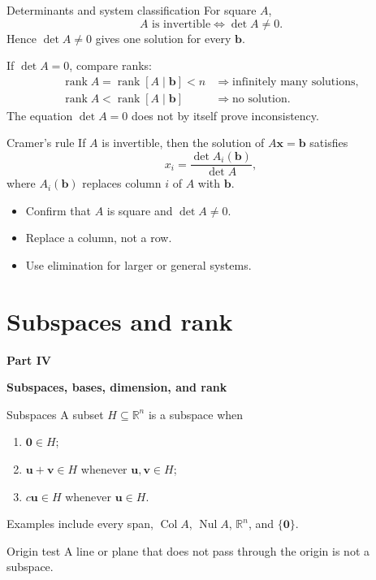 \documentclass[aspectratio=169]{beamer}
\newcommand{\R}{\mathbb{R}}
\newcommand{\vect}[1]{\mathbf{#1}}
\newcommand{\Col}{\operatorname{Col}}
\newcommand{\Nul}{\operatorname{Nul}}
\newcommand{\rank}{\operatorname{rank}}
\newcommand{\sectioncard}[2]{%
  \begin{frame}[plain]
    \vfill\centering
    {\Huge\color{lectureorange}\bfseries #1}\par\bigskip
    {\LARGE\color{lecturegreen}\bfseries #2}
    \vfill
  \end{frame}}
\begin{document}
\begin{frame}{Determinants and system classification}
For square $A$,
\[
A\text{ is invertible}\iff\det A\ne0.
\]
Hence $\det A\ne0$ gives one solution for every $\vect b$.
\medskip

If $\det A=0$, compare ranks:
\begin{align*}
\rank A=\rank[A\mid\vect b]<n
&\Longrightarrow \text{infinitely many solutions},\\
\rank A<\rank[A\mid\vect b]
&\Longrightarrow \text{no solution}.
\end{align*}
The equation $\det A=0$ does not by itself prove inconsistency.
\end{frame}

\begin{frame}{Cramer's rule}
If $A$ is invertible, then the solution of $A\vect x=\vect b$ satisfies
\[
x_i=\frac{\det A_i(\vect b)}{\det A},
\]
where $A_i(\vect b)$ replaces column $i$ of $A$ with $\vect b$.
\begin{itemize}
  \item Confirm that $A$ is square and $\det A\ne0$.
  \item Replace a column, not a row.
  \item Use elimination for larger or general systems.
\end{itemize}
\end{frame}

\section{Subspaces and rank}
\sectioncard{Part IV}{Subspaces, bases, dimension, and rank}

\begin{frame}{Subspaces}
A subset $H\subseteq\R^n$ is a subspace when
\begin{enumerate}
  \item $\vect0\in H$;
  \item $\vect u+\vect v\in H$ whenever $\vect u,\vect v\in H$;
  \item $c\vect u\in H$ whenever $\vect u\in H$.
\end{enumerate}
Examples include every span, $\Col A$, $\Nul A$, $\R^n$, and $\{\vect0\}$.
\begin{alertblock}{Origin test}
A line or plane that does not pass through the origin is not a subspace.
\end{alertblock}
\end{frame}
\end{document}
